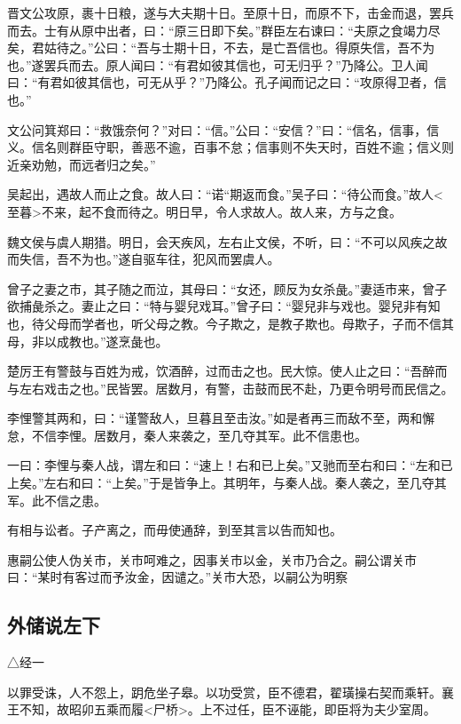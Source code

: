 \documentclass[]{article}
\begin{document}
晋文公攻原，裹十日粮，遂与大夫期十日。至原十日，而原不下，击金而退，罢兵而去。士有从原中出者，曰：``原三日即下矣。''群臣左右谏曰：``夫原之食竭力尽矣，君姑待之。''公曰：``吾与士期十日，不去，是亡吾信也。得原失信，吾不为也。''遂罢兵而去。原人闻曰：``有君如彼其信也，可无归乎？''乃降公。卫人闻曰：``有君如彼其信也，可无从乎？''乃降公。孔子闻而记之曰：``攻原得卫者，信也。''

文公问箕郑曰：``救饿奈何？''对曰：``信。''公曰：``安信？''曰：``信名，信事，信义。信名则群臣守职，善恶不逾，百事不怠；信事则不失天时，百姓不逾；信义则近亲劝勉，而远者归之矣。''

吴起出，遇故人而止之食。故人曰：``诺``期返而食。''吴子曰：``待公而食。''故人\textless{}至暮\textgreater{}不来，起不食而待之。明日早，令人求故人。故人来，方与之食。

魏文侯与虞人期猎。明日，会天疾风，左右止文侯，不听，曰：``不可以风疾之故而失信，吾不为也。''遂自驱车往，犯风而罢虞人。

曾子之妻之市，其子随之而泣，其母曰：``女还，顾反为女杀彘。''妻适市来，曾子欲捕彘杀之。妻止之曰：``特与婴兒戏耳。''曾子曰：``婴兒非与戏也。婴兒非有知也，待父母而学者也，听父母之教。今子欺之，是教子欺也。母欺子，子而不信其母，非以成教也。''遂烹彘也。

楚厉王有警鼓与百姓为戒，饮酒醉，过而击之也。民大惊。使人止之曰：``吾醉而与左右戏击之也。''民皆罢。居数月，有警，击鼓而民不赴，乃更令明号而民信之。

李悝警其两和，曰：``谨警敌人，旦暮且至击汝。''如是者再三而敌不至，两和懈怠，不信李悝。居数月，秦人来袭之，至几夺其军。此不信患也。

一曰：李悝与秦人战，谓左和曰：``速上！右和已上矣。''又驰而至右和曰：``左和已上矣。''左右和曰：``上矣。''于是皆争上。其明年，与秦人战。秦人袭之，至几夺其军。此不信之患。

有相与讼者。子产离之，而毋使通辞，到至其言以告而知也。

惠嗣公使人伪关市，关市呵难之，因事关市以金，关市乃合之。嗣公谓关市曰：``某时有客过而予汝金，因谴之。''关市大恐，以嗣公为明察

\hypertarget{header-n1332}{%
\subsection{外储说左下}\label{header-n1332}}

△经一

以罪受诛，人不怨上，跀危坐子皋。以功受赏，臣不德君，翟璜操右契而乘轩。襄王不知，故昭卯五乘而履\textless{}尸桥\textgreater{}。上不过任，臣不诬能，即臣将为夫少室周。
\end{document}

